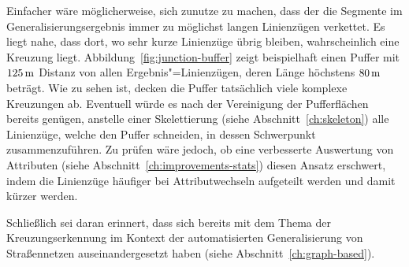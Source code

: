 \documentclass[../main/thesis.tex]{subfiles}
\begin{document}

Einfacher wäre möglicherweise, sich zunutze zu machen, dass der  die Segmente im Generalisierungsergebnis immer zu möglichst langen Linienzügen verkettet.
Es liegt nahe, dass dort, wo sehr kurze Linienzüge übrig bleiben, wahrscheinlich eine Kreuzung liegt.
Abbildung~\ref{fig:junction-buffer} zeigt beispielhaft einen Puffer mit $\unit[125]{m}$ Distanz von allen Ergebnis"=Linienzügen, deren Länge höchstens $\unit[80]{m}$ beträgt.
Wie zu sehen ist, decken die Puffer tatsächlich viele komplexe Kreuzungen ab.
Eventuell würde es nach der Vereinigung der Pufferflächen bereits genügen, anstelle einer Skelettierung (siehe Abschnitt~\ref{ch:skeleton}) alle Linienzüge, welche den Puffer schneiden, in dessen Schwerpunkt zusammenzuführen.
Zu prüfen wäre jedoch, ob eine verbesserte Auswertung von Attributen (siehe Abschnitt~\ref{ch:improvements-stats}) diesen Ansatz erschwert, indem die Linienzüge häufiger bei Attributwechseln aufgeteilt werden und damit kürzer werden.

Schließlich sei daran erinnert, dass sich \citeauthor{MM99} bereits mit dem Thema der Kreuzungserkennung im Kontext der automatisierten Generalisierung von Straßennetzen auseinandergesetzt haben (siehe Abschnitt~\ref{ch:graph-based}). 
\end{document}
